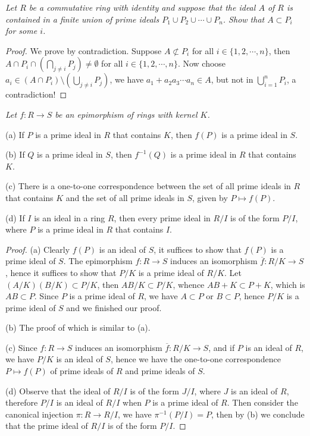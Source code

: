 \begin{problem}\em
Let $R$ be a commutative ring with identity and suppose that the ideal $A$ of $R$ is contained in a finite union of prime ideals $P_1\cup P_2\cup\cdots\cup P_n$. Show that $A\subset P_i$ for some $i$.
\end{problem}
\begin{proof}
We prove by contradiction. Suppose $A\not\subset P_i$ for all $i\in\{1,2,\cdots,n\}$, then $A\cap P_i\cap\left(\bigcap_{j\ne i}P_j\right)\ne\emptyset$ for all $i\in\{1,2,\cdots,n\}$. Now choose $a_i\in(A\cap P_i)\setminus\left(\bigcup_{j\ne i}P_j\right)$, we have $a_1+a_2a_3\cdots a_n\in A$, but not in $\bigcup_{i=1}^nP_i$, a contradiction!
\end{proof}
\begin{problem}\em
Let $f:R\to S$ be an epimorphism of rings with kernel $K$.\par
(a) If $P$ is a prime ideal in $R$ that contains $K$, then $f(P)$ is a prime ideal in $S$.\par
(b) If $Q$ is a prime ideal in $S$, then $f^{-1}(Q)$ is a prime ideal in $R$ that contains $K$.\par
(c) There is a one-to-one correspondence between the set of all prime ideals in $R$ that contains $K$ and the set of all prime ideals in $S$, given by $P\mapsto f(P)$.\par
(d) If $I$ is an ideal in a ring $R$, then every prime ideal in $R/I$ is of the form $P/I$, where $P$ is a prime ideal in $R$ that contains $I$.
\end{problem}
\begin{proof}
(a) Clearly $f(P)$ is an ideal of $S$, it suffices to show that $f(P)$ is a prime ideal of $S$. The epimorphism $f:R\to S$ induces an isomorphism $\overline{f}:R/K\to S$, hence it suffices to show that $P/K$ is a prime ideal of $R/K$. Let $(A/K)(B/K)\subset P/K$, then $AB/K\subset P/K$, whence $AB+K\subset P+K$, which is $AB\subset P$. Since $P$ is a prime ideal of $R$, we have $A\subset P$ or $B\subset P$, hence $P/K$ is a prime ideal of $S$ and we finished our proof.\par
(b) The proof of which is similar to (a).\par
(c) Since $f:R\to S$ induces an isomorphism $\overline{f}:R/K\to S$, and if $P$ is an ideal of $R$, we have $P/K$ is an ideal of $S$, hence we have the one-to-one correspondence $P\mapsto f(P)$ of prime ideals of $R$ and prime ideals of $S$.\par
(d) Observe that the ideal of $R/I$ is of the form $J/I$, where $J$ is an ideal of $R$, therefore $P/I$ is an ideal of $R/I$ when $P$ is a prime ideal of $R$. Then consider the canonical injection $\pi:R\to R/I$, we have $\pi^{-1}(P/I)=P$, then by (b) we conclude that the prime ideal of $R/I$ is of the form $P/I$.
\end{proof}
